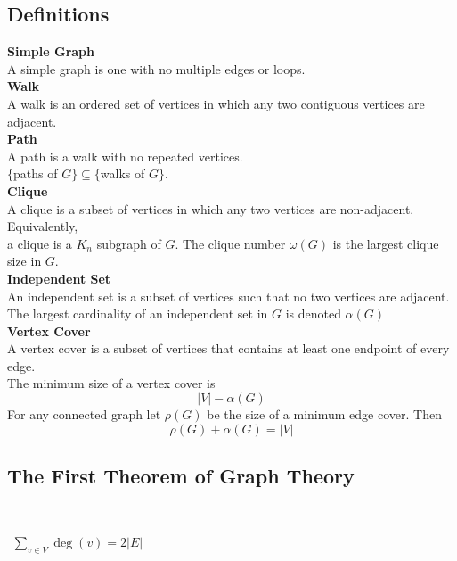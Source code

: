 \documentclass[12pt]{article}
\begin{document}
	\subsection{Definitions}
	\begin{center} \end{center}
	\begin{tcolorbox}
	\textbf{Simple Graph} \\
	\null \quad A simple graph is one with no multiple edges or loops. \\ 
	
	\textbf{Walk} \\
	\null \quad A walk is an ordered set of vertices in which any two contiguous vertices are adjacent.  \\
	
	\textbf{Path} \\
	\null \quad A path is a walk with no repeated vertices.  \\
	\null \quad  $\{$paths of $G$$\} \subseteq \{$walks of $G\}$. \\
	
	\textbf{Clique} \\
	\null \quad A clique is a subset of vertices in which any two vertices are non-adjacent. Equivalently, \\
	\null \quad a clique is a $K_n$ subgraph of $G$. The clique number $\omega(G)$ is the largest clique size in $G$. \\ 
	
	\textbf{Independent Set} \\
	\null \quad  An independent set is a subset of vertices such that no two vertices are adjacent. \\
	\null \quad  The largest cardinality of an independent set in $G$ is denoted $\alpha(G)$ \\
	
	
	\textbf{Vertex Cover} \\
	\null \quad A vertex cover is a subset of vertices that contains at least one endpoint of every edge. \\
	\null \quad  The minimum size of a vertex cover is $$|V| - \alpha(G)$$
	\null \quad For any connected graph let $\rho(G)$ be the size of a minimum edge cover. Then
	$$\rho(G) + \alpha(G) = |V|$$

	\end{tcolorbox}
	
	
	\subsection{The First Theorem of Graph Theory}
	\begin{center} \end{center}
	\begin{tcolorbox}
	\\
	\text{Let $G =(V,E)$ be a graph. Then,}
	
	\hfill
	\begin{center}
	$\begin{aligned}
	\sum_{v \in V} \deg(v) = 2|E|
	\end{aligned}$
	\end{center}
	\end{tcolorbox}
	
\end{document}
